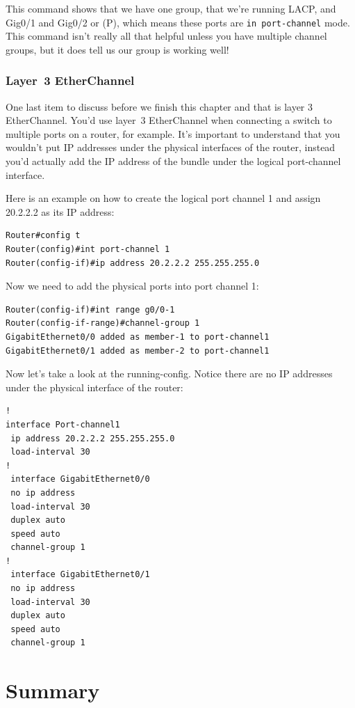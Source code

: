 This command shows that we have one group, that we're running LACP, and
Gig0/1 and Gig0/2 or (P), which means these ports are
\texttt{in\ port-channel} mode. This command isn't really all that
helpful unless you have multiple channel groups, but it does tell us our
group is working well!

\subsubsection{Layer~3 EtherChannel}

One last item to discuss before we finish this chapter and that is layer
3 EtherChannel. You'd use layer~3 EtherChannel when connecting a switch
to multiple ports on a router, for example. It's important to understand
that you wouldn't put IP addresses under the physical interfaces
of the router, instead you'd actually add the IP address of the bundle
under the logical port-channel interface.

Here is an example on how to create the logical port channel 1 and
assign 20.2.2.2 as its IP address:

\begin{verbatim}
Router#config t
Router(config)#int port-channel 1
Router(config-if)#ip address 20.2.2.2 255.255.255.0
\end{verbatim}

Now we need to add the physical ports into port channel 1:

\begin{verbatim}
Router(config-if)#int range g0/0-1
Router(config-if-range)#channel-group 1
GigabitEthernet0/0 added as member-1 to port-channel1
GigabitEthernet0/1 added as member-2 to port-channel1
\end{verbatim}

Now let's take a look at the running-config. Notice there are no IP
addresses under the physical interface of the router:

\begin{verbatim}
!
interface Port-channel1
 ip address 20.2.2.2 255.255.255.0
 load-interval 30
!
 interface GigabitEthernet0/0
 no ip address
 load-interval 30
 duplex auto
 speed auto
 channel-group 1
!
 interface GigabitEthernet0/1
 no ip address
 load-interval 30
 duplex auto
 speed auto
 channel-group 1
\end{verbatim}

\section{Summary}

